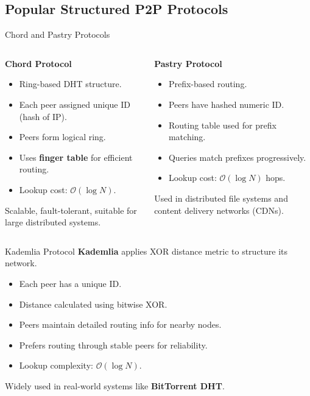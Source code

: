 \documentclass[aspectratio=169, table]{beamer}
\begin{document}
\subsection{Popular Structured P2P Protocols}

\begin{frame}{Chord and Pastry Protocols}
	\vspace{20pt}
	\begin{columns}[t]
		
		\begin{column}{0.5\textwidth}
			\textbf{Chord Protocol}
			\begin{itemize}
				\item Ring-based DHT structure.
				\item Each peer assigned unique ID (hash of IP).
				\item Peers form logical ring.
				\item Uses \textbf{finger table} for efficient routing.
				\item Lookup cost: \(\mathcal{O}(\log N)\).
			\end{itemize}
			Scalable, fault-tolerant, suitable for large distributed systems.
		\end{column}
		
		\begin{column}{0.5\textwidth}
			\textbf{Pastry Protocol}
			\begin{itemize}
				\item Prefix-based routing.
				\item Peers have hashed numeric ID.
				\item Routing table used for prefix matching.
				\item Queries match prefixes progressively.
				\item Lookup cost: \(\mathcal{O}(\log N)\) hops.
			\end{itemize}
			Used in distributed file systems and content delivery networks (CDNs).
		\end{column}
		
	\end{columns}
\end{frame}



\begin{frame}{Kademlia Protocol}
	\vspace{20pt}
	\textbf{Kademlia} applies XOR distance metric to structure its network.
	\begin{itemize}
		\item Each peer has a unique ID.
		\item Distance calculated using bitwise XOR.
		\item Peers maintain detailed routing info for nearby nodes.
		\item Prefers routing through stable peers for reliability.
		\item Lookup complexity: \(\mathcal{O}(\log N)\).
	\end{itemize}
	Widely used in real-world systems like \textbf{BitTorrent DHT}.
\end{frame}
\end{document}
